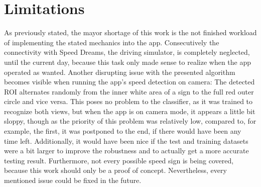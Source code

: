
\chapter{Limitations}\label{chapter:limitations}
As previously stated, the mayor shortage of this work is the not finished workload of implementing the stated mechanics into the app. \newline
Consecutively the connectivity with Speed Dreams, the driving simulator, is completely neglected, until the current day, because this task only made sense to realize when the app operated as wanted.\newline
Another disrupting issue with the presented algorithm becomes visible when running the app's speed detection on camera: The detected ROI alternates randomly from the inner white area of a sign to the full red outer circle and vice versa. This poses no problem to the classifier, as it was trained to recognize both views, but when the app is on camera mode, it appears a little bit sloppy, though as the priority of this problem was relatively low, compared to, for example, the first, it was postponed to the end, if there would have been any time left.\newline  
Additionally, it would have been nice if the test and training datasets were a bit larger to improve the robustness and to actually get a more accurate testing result. Furthermore, not every possible speed sign is being covered, because this work should only be a proof of concept.  
Nevertheless, every mentioned issue could be fixed in the future.



